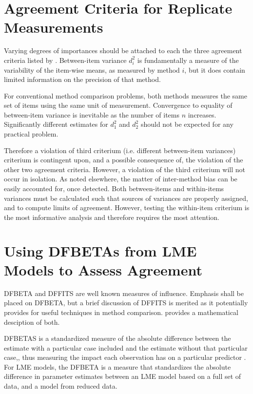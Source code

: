 \documentclass[12pt, a4paper]{report}
\theoremstyle{definition}
\theoremstyle{remark}
\begin{document}
\section{Agreement Criteria for Replicate Measurements}


Varying degrees of importances should be attached to each the three agreement criteria listed by \citet{Barnhart}. Between-item variance $d^2_i$ is fundamentally a measure of the variability of the item-wise means, as measured by method $i$, but it does contain limited information on the precision of that method. 

For conventional method comparison problems, both methods measures the same set of items using the same unit of measurement. Convergence to equality of between-item variance is inevitable as the number of items $n$ increases. Significantly different estimates for $d^2_1$ and $d^2_2$ should not be expected for any practical problem. 

Therefore a violation of third criterium (i.e. different between-item variances) criterium is contingent upon, and a  
possible consequence of, the violation of the other two agreement criteria. However, a violation of the third criterium will not occur in isolation. As noted elsewhere, the matter of inter-method bias can be easily accounted for, once detected. Both between-items and within-items variances must be calculated such that sources of variances are properly assigned, and to compute limits of agreement. However, testing the within-item criterium is the most informative analysis and therefore requires the most attention. 







\section{Using DFBETAs from LME Models to Assess Agreement}

 DFBETA and DFFITS are well known measures of influence. Emphasis shall be placed on DFBETA, but a brief discussion of DFFITS is merited as it potentially provides for useful techniques in method comparison. \citet{schabenberger} provides a mathematical desciption of both.


DFBETAS is a standardized measure of the absolute difference between the estimate with a particular
case included and the estimate without that particular case,, thus measuring the impact each observation has on a particular predictor \citep{belsley2005}. For LME models, the DFBETA is a measure that standardizes the absolute difference in parameter estimates between an LME model based on a full set of data, and a model from reduced data.
\end{document}
